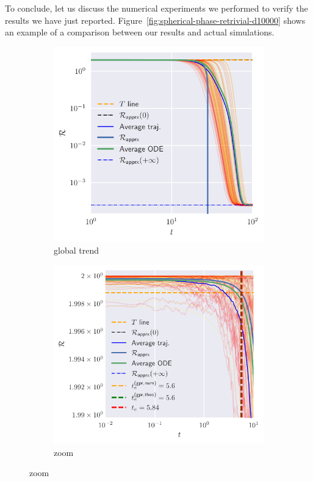 To conclude, let us discuss the numerical experiments we performed to verify the results we have just reported.
Figure~\ref{fig:spherical-phase-retrivial-d10000} shows an example of a comparison between our results and actual simulations.
\begin{figure}
  \centering
  \begin{subfigure}{0.75\textwidth}
    \includegraphics[width=1.\textwidth]{figures/spherical/spr-example-d10000.pdf}
    \caption{global trend}
  \end{subfigure}
  \begin{subfigure}{0.77\textwidth}
    \includegraphics[width=1.\textwidth]{figures/spherical/spr-example-d10000-zoom.pdf}
    \caption{zoom}
  \end{subfigure}


\end{figure}
